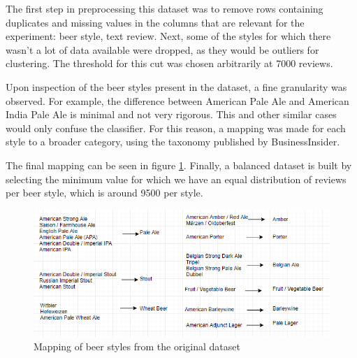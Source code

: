 \documentclass[12pt]{article}
\begin{document}
	The first step in preprocessing this dataset was to remove rows containing duplicates and missing values in the columns that are relevant for the experiment: beer style, text review. Next, some of the styles for which there wasn't a lot of data available were dropped, as they would be outliers for clustering. The threshold for this cut was chosen arbitrarily at 7000 reviews. 
	
	Upon inspection of the beer styles present in the dataset, a fine granularity was observed. For example, the difference between American Pale Ale and American India Pale Ale is minimal and not very rigorous. This and other similar cases would only confuse the classifier. For this reason, a mapping was made for each style to a broader category, using the taxonomy published by BusinessInsider\cite{BeerTaxonomy}. 
	
	The final mapping can be seen in figure \ref{fig:styleMapping}. Finally, a balanced dataset is built by selecting the minimum value for which we have an equal distribution of reviews per beer style, which is around 9500 per style.
	
	\begin{figure}
		\includegraphics[width=\linewidth]{resources/MappingDiagram.png}
		\caption{Mapping of beer styles from the original dataset}
		\label{fig:styleMapping}
	\end{figure}
	
	
	\newpage
	
	
\end{document}
